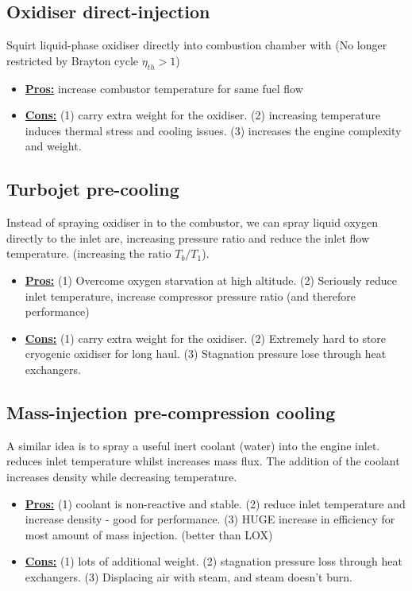 \documentclass[a4paper,10pt]{article}
\begin{document}
\subsection{Oxidiser direct-injection}
Squirt liquid-phase oxidiser directly into combustion chamber with (No longer restricted by Brayton cycle $\eta_{th}>1$)
\begin{itemize}
    \item \underline{\textbf{Pros:}} increase combustor temperature for same fuel flow
    \item \underline{\textbf{Cons:}} (1) carry extra weight for the oxidiser. (2) increasing temperature induces thermal stress and cooling issues. (3) increases the engine complexity and weight. 
\end{itemize}

\subsection{Turbojet pre-cooling}
Instead of spraying oxidiser in to the combustor, we can spray liquid oxygen directly to the inlet are, increasing pressure ratio and reduce the inlet flow temperature. (increasing the ratio $T_b/T_1$).
\begin{itemize}
    \item \underline{\textbf{Pros:}} (1) Overcome oxygen starvation at high altitude. (2) Seriously reduce inlet temperature, increase compressor pressure ratio (and therefore performance)
    \item \underline{\textbf{Cons:}} (1) carry extra weight for the oxidiser. (2) Extremely hard to store cryogenic oxidiser for long haul. (3) Stagnation pressure lose through heat exchangers. 
\end{itemize}

\subsection{Mass-injection pre-compression cooling}
A similar idea is to spray a useful inert coolant (water) into the engine inlet. reduces inlet temperature whilst increases mass flux. The addition of the coolant increases density while decreasing temperature. 
\begin{itemize}
    \item \underline{\textbf{Pros:}} (1) coolant is non-reactive and stable. (2) reduce inlet temperature and increase density - good for performance. (3) HUGE increase in efficiency for most amount of mass injection. (better than LOX)
    \item \underline{\textbf{Cons:}} (1) lots of additional weight. (2) stagnation pressure loss through heat exchangers. (3) Displacing air with steam, and steam doesn't burn.
\end{itemize}
\end{document}
